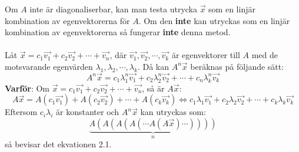 \documentclass{report}
\begin{document}
{
	Om $A$ inte är diagonaliserbar, kan man testa utrycka $\vec{x}$ som en linjär kombination av egenvektorerna för $A$. Om den \textbf{inte} kan utryckas som en linjär kombination av egenvektorerna så fungerar \textbf{inte} denna metod.\\\\
	Låt $\vec{x} = c_1\vec{v_1}+c_2\vec{v_2}+\cdots+\vec{v_n}$, där $\vec{v_1}, \vec{v_2}, \cdots, \vec{v_k}$ är egenvektorer till $A$ med de motsvarande egenvärden $\lambda_1, \lambda_2, \cdots, \lambda_k$. Då kan $A^n\vec{x}$ beräknas på följande sätt:
\begin{equation}
	A^n\vec{x} = c_1 \lambda_1^n \vec{v_1} + c_2 \lambda_2^n \vec{v_2} + \cdots + c_n \lambda_k^n \vec{v_k}
\end{equation}
	\textbf{Varför}: Om $\vec{x} = c_1\vec{v_1}+c_2\vec{v_2}+\cdots+\vec{v_n}$, så är $A\vec{x}$:
\begin{equation*}
	A\vec{x} = A(c_1\vec{v_1})+A(c_2\vec{v_2})+\cdots+A(c_k\vec{v_k}) \iff c_1\lambda_1\vec{v_1}+c_2\lambda_2\vec{v_2}+\cdots+c_k\lambda_k\vec{v_k}
\end{equation*}
	Eftersom $c_i\lambda_i$ är konstanter och $A^n\vec{x}$ kan utryckas som:
\begin{equation*}
	\underbrace{A(A(A(A(\cdots A(A\vec{x})\cdots))))}_{n}
\end{equation*}
	så bevisar det ekvationen 2.1.
}
\end{document}
